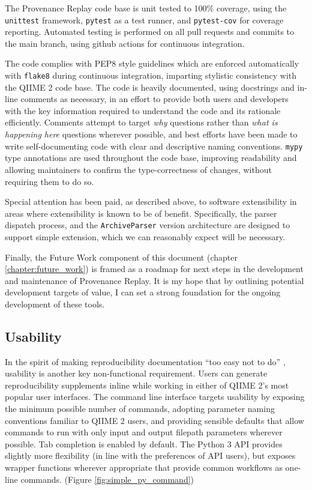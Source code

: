 The Provenance Replay code base is unit tested to 100\% coverage, using
the \texttt{unittest} \parencite{python_software_foundation_unittest_2001} framework,
\texttt{pytest} \parencite{krekel_pytest_2015} as a test runner, and \texttt{pytest-cov} \parencite{pytest-cov_contributors_welcome_2016}
for coverage reporting. Automated testing is performed on all pull requests and
commits to the main branch, using github actions
\parencite{github_features_2022} for continuous integration.

The code complies with PEP8 style guidelines \parencite{van_rossum_pep_2001}
which are enforced automatically with \texttt{flake8} during continuous integration,
imparting stylistic consistency with the QIIME 2 code base. The code is heavily
documented, using docstrings and in-line comments as necessary, in an effort to
provide both users and developers with the key information required to
understand the code and its rationale efficiently. Comments attempt to target
\textit{why} questions rather than \textit{what is happening here} questions
wherever possible, and best efforts have been made to write self-documenting
code with clear and descriptive naming conventions. \texttt{mypy} type annotations
\parencite{lehtosalo_mypy_2014} are used throughout the code base, improving
readability and allowing maintainers to confirm the type-correctness of changes,
without requiring them to do so.

Special attention has been paid, as described above, to software extensibility
in areas where extensibility is known to be of benefit. Specifically, the parser
dispatch process, and the \texttt{ArchiveParser} version architecture are designed to
support simple extension, which we can reasonably expect will be necessary. 

Finally, the Future Work component of this document (chapter \ref{chapter:future_work})
is framed as a roadmap for next steps in the development and maintenance of
Provenance Replay. It is my hope that by outlining potential development targets
of value, I can set a strong foundation for the ongoing development of these
tools.


\subsection{Usability}

In the spirit of making reproducibility documentation “too easy not to do” \parencite[19]{whitaker_turing_2019},
usability is another key non-functional requirement. Users can generate
reproducibility supplements inline while working in either of QIIME 2’s most
popular user interfaces. The command line interface targets usability by
exposing the minimum possible number of commands, adopting parameter naming
conventions familiar to QIIME 2 users, and providing sensible defaults that
allow commands to run with only input and output filepath parameters wherever
possible. Tab completion is enabled by default. The Python 3 API provides
slightly more flexibility (in line with the preferences of API users), but
exposes wrapper functions wherever appropriate that provide common workflows as
one-line commands. (Figure \ref{fig:simple_py_command})

